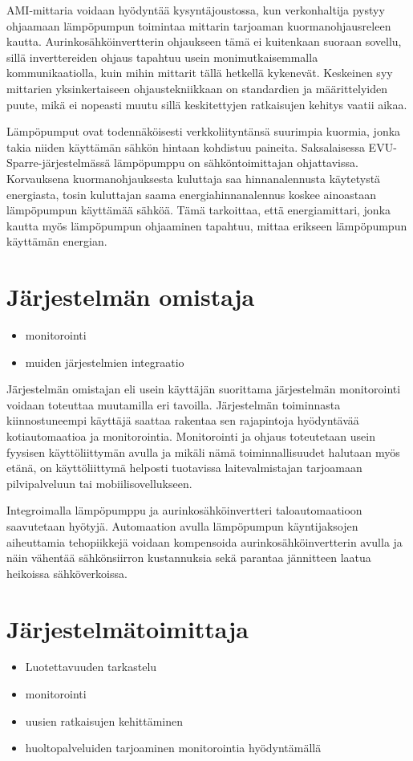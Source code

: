   AMI-mittaria voidaan hyödyntää kysyntäjoustossa, kun verkonhaltija pystyy ohjaamaan lämpöpumpun toimintaa mittarin tarjoaman kuormanohjausreleen kautta. Aurinkosähköinvertterin ohjaukseen tämä ei kuitenkaan suoraan sovellu, sillä inverttereiden ohjaus tapahtuu usein monimutkaisemmalla kommunikaatiolla, kuin mihin mittarit tällä hetkellä kykenevät. Keskeinen syy mittarien yksinkertaiseen ohjaustekniikkaan on standardien ja määrittelyiden puute, mikä ei nopeasti muutu sillä keskitettyjen ratkaisujen kehitys vaatii aikaa.

  Lämpöpumput ovat todennäköisesti verkkoliityntänsä suurimpia kuormia, jonka takia niiden käyttämän sähkön hintaan kohdistuu paineita. Saksalaisessa EVU-Sparre-järjestelmässä lämpöpumppu on sähköntoimittajan ohjattavissa. Korvauksena kuormanohjauksesta kuluttaja saa hinnanalennusta käytetystä energiasta, tosin kuluttajan saama energiahinnanalennus koskee ainoastaan lämpöpumpun käyttämää sähköä. Tämä tarkoittaa, että energiamittari, jonka kautta myös lämpöpumpun ohjaaminen tapahtuu, mittaa erikseen lämpöpumpun käyttämän energian.\parencite{enwg, VDEARN4100}

\section{Järjestelmän omistaja}
  \begin{itemize}
    \item monitorointi
    \item muiden järjestelmien integraatio
  \end{itemize}

  Järjestelmän omistajan eli usein käyttäjän suorittama järjestelmän monitorointi voidaan toteuttaa muutamilla eri tavoilla. Järjestelmän toiminnasta kiinnostuneempi käyttäjä saattaa rakentaa sen rajapintoja hyödyntävää kotiautomaatioa ja monitorointia. Monitorointi ja ohjaus toteutetaan usein fyysisen käyttöliittymän avulla ja mikäli nämä toiminnallisuudet halutaan myös etänä, on käyttöliittymä helposti tuotavissa laitevalmistajan tarjoamaan pilvipalveluun tai mobiilisovellukseen.

  Integroimalla lämpöpumppu ja aurinkosähköinvertteri taloautomaatioon saavutetaan hyötyjä. Automaation avulla lämpöpumpun käyntijaksojen aiheuttamia tehopiikkejä voidaan kompensoida aurinkosähköinvertterin avulla ja näin vähentää sähkönsiirron kustannuksia sekä parantaa jännitteen laatua heikoissa sähköverkoissa.

\section{Järjestelmätoimittaja}
  \begin{itemize}
    \item Luotettavuuden tarkastelu
    \item monitorointi
    \item uusien ratkaisujen kehittäminen
    \item huoltopalveluiden tarjoaminen monitorointia hyödyntämällä
  \end{itemize}

